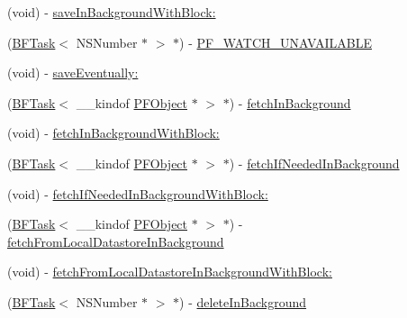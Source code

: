 \begin{DoxyCompactItemize}
\begin{DoxyCompactList}
 \end{DoxyCompactList}\item 
(void) -\/ \hyperlink{interface_p_f_object_a110c3b534d7ec78587a27c31ede40c74}{save\+In\+Background\+With\+Block\+:}
\item 
(\hyperlink{class_b_f_task}{B\+F\+Task}$<$ N\+S\+Number $\ast$ $>$ $\ast$) -\/ \hyperlink{interface_p_f_object_a2fc716d88cbd20d30e623ea4b3fa3ec2}{P\+F\+\_\+\+W\+A\+T\+C\+H\+\_\+\+U\+N\+A\+V\+A\+I\+L\+A\+B\+L\+E}
\item 
(void) -\/ \hyperlink{interface_p_f_object_a1424873580c136d55c3462f42fc35c49}{save\+Eventually\+:}
\item 
(\hyperlink{class_b_f_task}{B\+F\+Task}$<$ \+\_\+\+\_\+kindof \hyperlink{interface_p_f_object}{P\+F\+Object} $\ast$ $>$ $\ast$) -\/ \hyperlink{interface_p_f_object_ad912e14dcbd3640621054f23869724bc}{fetch\+In\+Background}
\item 
(void) -\/ \hyperlink{interface_p_f_object_a49cc24a37f3fce870105ce9c599e0003}{fetch\+In\+Background\+With\+Block\+:}
\item 
(\hyperlink{class_b_f_task}{B\+F\+Task}$<$ \+\_\+\+\_\+kindof \hyperlink{interface_p_f_object}{P\+F\+Object} $\ast$ $>$ $\ast$) -\/ \hyperlink{interface_p_f_object_a2cf6b58286c2d8530b9bdd4bb845511a}{fetch\+If\+Needed\+In\+Background}
\item 
(void) -\/ \hyperlink{interface_p_f_object_a261b0e462f3ef00af20e1e8cf263a9bb}{fetch\+If\+Needed\+In\+Background\+With\+Block\+:}
\item 
(\hyperlink{class_b_f_task}{B\+F\+Task}$<$ \+\_\+\+\_\+kindof \hyperlink{interface_p_f_object}{P\+F\+Object} $\ast$ $>$ $\ast$) -\/ \hyperlink{interface_p_f_object_a8dcab41867530af5d07dccb2b4250337}{fetch\+From\+Local\+Datastore\+In\+Background}
\begin{DoxyCompactList}\small\item\em 

 \end{DoxyCompactList}\item 
(void) -\/ \hyperlink{interface_p_f_object_a4eaa856effd724df3190ee56ab1eecbb}{fetch\+From\+Local\+Datastore\+In\+Background\+With\+Block\+:}
\item 
(\hyperlink{class_b_f_task}{B\+F\+Task}$<$ N\+S\+Number $\ast$ $>$ $\ast$) -\/ \hyperlink{interface_p_f_object_a66e24b4f9b46ea3089dd6cc956511bd0}{delete\+In\+Background}
\begin{DoxyCompactList}\small\item\em 


\end{DoxyCompactList}
\end{DoxyCompactItemize}
